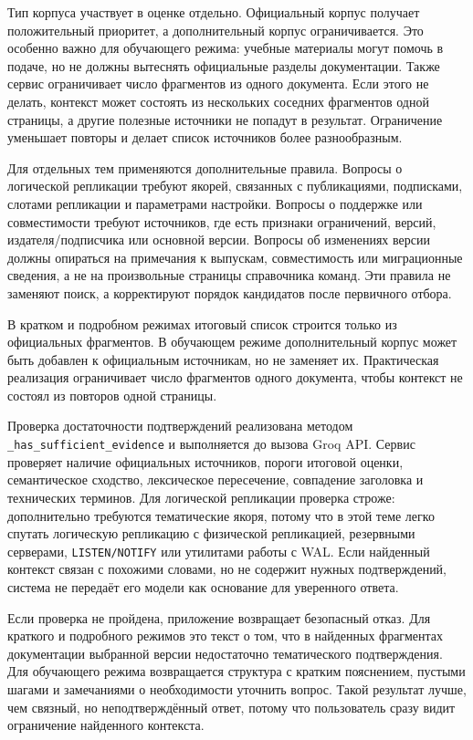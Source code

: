 Тип корпуса участвует в оценке отдельно. Официальный корпус получает положительный приоритет, а дополнительный корпус ограничивается. Это особенно важно для обучающего режима: учебные материалы могут помочь в подаче, но не должны вытеснять официальные разделы документации. Также сервис ограничивает число фрагментов из одного документа. Если этого не делать, контекст может состоять из нескольких соседних фрагментов одной страницы, а другие полезные источники не попадут в результат. Ограничение уменьшает повторы и делает список источников более разнообразным.

Для отдельных тем применяются дополнительные правила. Вопросы о логической репликации требуют якорей, связанных с публикациями, подписками, слотами репликации и параметрами настройки. Вопросы о поддержке или совместимости требуют источников, где есть признаки ограничений, версий, издателя/подписчика или основной версии. Вопросы об изменениях версии должны опираться на примечания к выпускам, совместимость или миграционные сведения, а не на произвольные страницы справочника команд. Эти правила не заменяют поиск, а корректируют порядок кандидатов после первичного отбора.

В кратком и подробном режимах итоговый список строится только из официальных фрагментов. В обучающем режиме дополнительный корпус может быть добавлен к официальным источникам, но не заменяет их. Практическая реализация ограничивает число фрагментов одного документа, чтобы контекст не состоял из повторов одной страницы.

Проверка достаточности подтверждений реализована методом \texttt{\_has\_sufficient\_evidence} и выполняется до вызова Groq API. Сервис проверяет наличие официальных источников, пороги итоговой оценки, семантическое сходство, лексическое пересечение, совпадение заголовка и технических терминов. Для логической репликации проверка строже: дополнительно требуются тематические якоря, потому что в этой теме легко спутать логическую репликацию с физической репликацией, резервными серверами, \texttt{LISTEN/NOTIFY} или утилитами работы с WAL. Если найденный контекст связан с похожими словами, но не содержит нужных подтверждений, система не передаёт его модели как основание для уверенного ответа.

Если проверка не пройдена, приложение возвращает безопасный отказ. Для краткого и подробного режимов это текст о том, что в найденных фрагментах документации выбранной версии недостаточно тематического подтверждения. Для обучающего режима возвращается структура с кратким пояснением, пустыми шагами и замечаниями о необходимости уточнить вопрос. Такой результат лучше, чем связный, но неподтверждённый ответ, потому что пользователь сразу видит ограничение найденного контекста.

